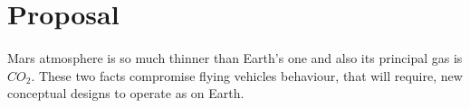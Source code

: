 \section{Proposal}
\paragraph{} Mars atmosphere is so much thinner than Earth's one and also its principal gas is $CO_2$. These two facts compromise flying vehicles behaviour, that will require, new conceptual designs to operate as on Earth.